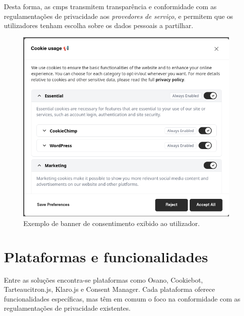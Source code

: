 Desta forma, as \acrshort{cmp}s transmitem transparência e conformidade com as regulamentações de privacidade aos \textit{provedores de serviço}, e permitem que os utilizadores tenham escolha sobre os dados pessoais a partilhar.

\begin{figure}[h]
\begin{center}
	\includegraphics[width=1.0\textwidth]{images/banner.png}
\end{center}
\caption{Exemplo de banner de consentimento exibido ao utilizador.}
\label{fig:banner}
\end{figure}

\newpage

\section{Plataformas e funcionalidades}
Entre as soluções encontra-se plataformas como Osano, Cookiebot, Tarteaucitron.js, Klaro.js e Consent Manager. Cada plataforma oferece funcionalidades específicas, mas têm em comum o foco na conformidade com as regulamentações de privacidade existentes.


